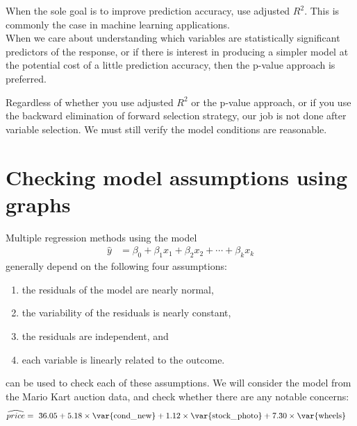 \begin{tipBox}{
When the sole goal is to improve prediction accuracy, use adjusted $R^2$. This is commonly the case in machine learning applications.\\[-2mm]

When we care about understanding which variables are statistically significant predictors of the response, or if there is interest in producing a simpler model at the potential cost of a little prediction accuracy, then the p-value approach is preferred.}
\end{tipBox}

Regardless of whether you use adjusted $R^2$ or the p-value approach, or if you use the backward elimination of forward selection strategy, our job is not done after variable selection. We must still verify the model conditions are reasonable.




\section[Checking model assumptions using graphs]{Checking model assumptions using graphs ~}
\label{multipleRegressionModelAssumptions}


Multiple regression methods using the model
\begin{align*}
\hat{y} &= \beta_0 + \beta_1x_1 + \beta_2x_2 + \cdots + \beta_kx_k
\end{align*}
generally depend on the following four assumptions:
\begin{enumerate}
\setlength{\itemsep}{0mm}
\item the residuals of the model are nearly normal,
\item the variability of the residuals is nearly constant,
\item the residuals are independent, and
\item each variable is linearly related to the outcome.
\end{enumerate}
 can be used to check each of these assumptions. We will consider the model from the Mario Kart auction data, and check whether there are any notable concerns:
\begin{align*}
\widehat{price} &= \ 36.05 + 5.18 \times \text{\var{cond\_\hspace{0.3mm}new}} + 1.12 \times \text{\var{stock\_\hspace{0.3mm}photo}} + 7.30 \times \text{\var{wheels}}
\end{align*}

